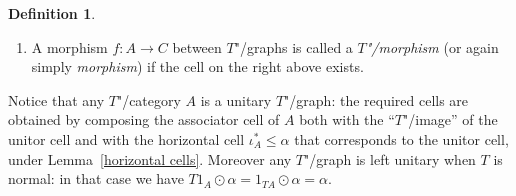 \documentclass[preprint, a4paper]{elsarticle}
\theoremstyle{definition}
\newtheorem{definition}[theorem]{Definition}
\theoremstyle{remark}
\providecommand{\lemref}[1]{Lemma~\ref{#1}}
\providecommand{\map}[3]{#1\colon#2\to#3}
\providecommand{\2}{\mathsf 2}
\providecommand{\hc}{\odot}
\begin{document}
\begin{definition}
\begin{enumerate}[label=-]
  		\begin{displaymath}
  			\begin{tikzpicture}
  				\matrix(m)[math35]{T^2A & TA & A \\ TA & & A \\};
  				\path[map]	(m-1-1) edge[barred] node[above] {$T\alpha$} (m-1-2)
  														edge node[left] {$\mu_A$} (m-2-1)
  										(m-1-2) edge[barred] node[above] {$\alpha$} (m-1-3)
  										(m-2-1) edge[barred] node[below] {$\alpha$} (m-2-3);
  				\path				(m-1-3) edge[eq] (m-2-3);
  				\draw				($(m-1-2)!0.5!(m-2-2)$) node[rotate=-90] {$\leq$};
  			\end{tikzpicture} \qquad \qquad \qquad \begin{tikzpicture}
					\matrix(m)[math35]{TA & A \\ TC & C \\};
					\path[map]	(m-1-1) edge[barred] node[above] {$\alpha$} (m-1-2)
															edge node[left] {$Tf$} (m-2-1)
											(m-1-2) edge node[right] {$f$} (m-2-2)
											(m-2-1) edge[barred] node[below] {$\gamma$} (m-2-2);
					\draw				($(m-1-1)!0.5!(m-2-2)$) node[rotate=-90] {$\leq$};
				\end{tikzpicture}
  		\end{displaymath}
  		\item A morphism $\map fAC$ between $T$"/graphs is called a \emph{$T$"/morphism} (or again simply \emph{morphism}) if the cell on the right above exists.
  	\end{enumerate}
  \end{definition}
  Notice that any $T$"/category $A$ is a unitary $T$"/graph: the required cells are obtained by composing the associator cell of $A$ both with the ``$T$"/image'' of the unitor cell and with the horizontal cell $\iota^*_A \leq \alpha$ that corresponds to the unitor cell, under \lemref{horizontal cells}. Moreover any $T$"/graph is left unitary when $T$ is normal: in that case we have $T1_A \hc \alpha = 1_{TA} \hc \alpha = \alpha$.
  	
\end{document}
